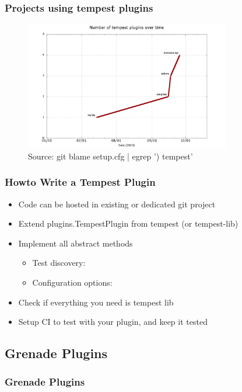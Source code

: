 \documentclass[aspectratio=169,11pt,hyperref={colorlinks=true}]{beamer}
\begin{document}
\begin{frame}
    \frametitle{Projects using tempest plugins}
    \begin{figure}[p]
    	\centering
    	\includegraphics[width=0.8\textwidth]{tempest-plugins.png}
    	\caption{Source: git blame setup.cfg | egrep ') tempest'}
    \end{figure}
\end{frame}

\begin{frame}
    \frametitle{Howto Write a Tempest Plugin}
    \begin{itemize}
    	\item{Code can be hosted in existing or dedicated git project}
    	\item{Extend plugins.TempestPlugin from tempest (or tempest-lib)}
    	\item{Implement all abstract methods}
    		\begin{itemize}
    			\item{Test discovery: }
    			\item{Configuration options: }
    		\end{itemize}
    	\item{Check if everything you need is tempest lib}
    	\item{Setup CI to test with your plugin, and keep it tested}
    \end{itemize}
\end{frame}

\subsection{Grenade Plugins}
\begin{frame}
    \frametitle{Grenade Plugins}
\end{frame}
\end{document}

